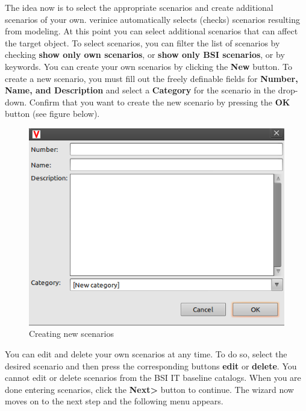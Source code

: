 \documentclass[a4paper,10pt]{book}
\begin{document}
The idea now is to select the appropriate scenarios and create additional scenarios
of your own. verinice automatically selects (checks) scenarios resulting from modeling.
At this point you can select additional scenarios that can affect the target object. To
select scenarios, you can filter the list of scenarios by checking \textbf{show only own scenarios}, or
\textbf{show only BSI scenarios}, or by keywords. You can create your own scenarios by clicking the
\textbf{New} button. To create a new scenario, you must fill out the freely definable fields for
\textbf{Number, Name, and Description} and select a \textbf{Category} for the scenario in the drop-down.
Confirm that you want to create the new scenario by pressing the \textbf{OK} button (see figure below).
\newline
\begin{figure}[htb!]
  \centering
  \includegraphics[width=\textwidth]{Screenshot/Anlegen_von_neuen_Gefaehrdungen-en.png}
  \caption{\label{Creating new scenarios} Creating new scenarios}
\end{figure}
\newline
You can edit and delete your own scenarios at any time. To do so, select
the desired scenario and then press the corresponding buttons \textbf{edit} or \textbf{delete}.
You cannot edit or delete scenarios from the BSI IT baseline catalogs. When you are done
entering scenarios, click the \textbf{Next\textgreater} button to continue. The wizard now moves
on to the next step and the following menu appears.
\newline
\end{document}
